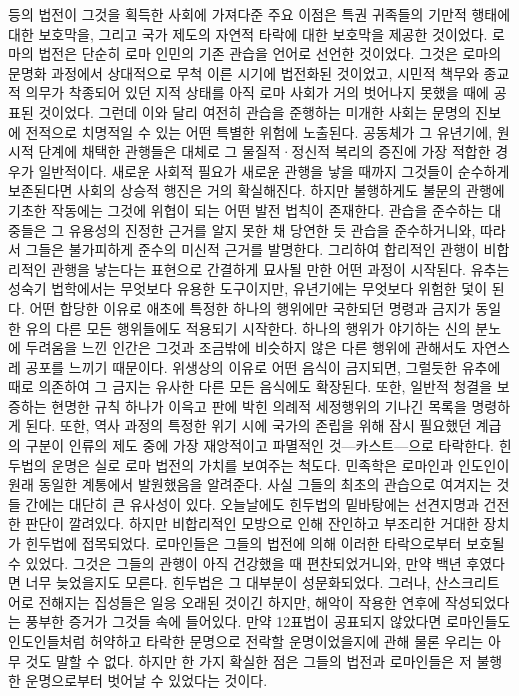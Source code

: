  등의 법전이 그것을 획득한 사회에 가져다준 주요 이점은
특권 귀족들의 기만적 행태에 대한 보호막을,
그리고 국가 제도의 자연적 타락에 대한 보호막을 제공한 것이었다.
로마의 법전은 단순히 로마 인민의 기존 관습을 언어로 선언한 것이었다.
그것은 로마의 문명화 과정에서 상대적으로 무척 이른 시기에 법전화된 것이었고,
시민적 책무와 종교적 의무가 착종되어 있던 지적 상태를 아직
로마 사회가 거의 벗어나지 못했을 때에 공표된 것이었다.
그런데 이와 달리 여전히 관습을 준행하는 미개한 사회는
문명의 진보에 전적으로 치명적일 수 있는 어떤 특별한 위험에 노출된다.
공동체가 그 유년기에, 원시적 단계에 채택한 관행들은
대체로 그 물질적^^b7정신적 복리의 증진에 가장 적합한 경우가 일반적이다.
새로운 사회적 필요가 새로운 관행을 낳을 때까지 그것들이 순수하게 보존된다면
사회의 상승적 행진은 거의 확실해진다.
하지만 불행하게도 불문의 관행에 기초한 작동에는 그것에 위협이 되는
어떤 발전 법칙이 존재한다.
관습을 준수하는 대중들은 그 유용성의 진정한 근거를 알지 못한 채
당연한 듯 관습을 준수하거니와,
따라서 그들은 불가피하게 준수의 미신적 근거를 발명한다.
그리하여 합리적인 관행이 비합리적인 관행을 낳는다는 표현으로
간결하게 묘사될 만한 어떤 과정이 시작된다.
유추는 성숙기 법학에서는 무엇보다 유용한 도구이지만,
유년기에는 무엇보다 위험한 덫이 된다.
어떤 합당한 이유로 애초에 특정한 하나의 행위에만 국한되던 명령과 금지가
동일한 유의 다른 모든 행위들에도 적용되기 시작한다.
하나의 행위가 야기하는 신의 분노에 두려움을 느낀 인간은
그것과 조금밖에 비슷하지 않은 다른 행위에 관해서도
자연스레 공포를 느끼기 때문이다.
위생상의 이유로 어떤 음식이 금지되면,
그럴듯한 유추에 때로 의존하여
그 금지는 유사한 다른 모든 음식에도 확장된다.
또한, 일반적 청결을 보증하는 현명한 규칙 하나가 이윽고
판에 박힌 의례적 세정행위의 기나긴 목록을 명령하게 된다.
또한, 역사 과정의 특정한 위기 시에 국가의 존립을 위해 잠시 필요했던
계급의 구분이 인류의 제도 중에 가장 재앙적이고 파멸적인 것---카스트---으로
타락한다.
힌두법의 운명은 실로 로마 법전의 가치를 보여주는 척도다.
민족학은 로마인과 인도인이 원래 동일한 계통에서 발원했음을 알려준다.
사실 그들의 최초의 관습으로 여겨지는 것들 간에는
대단히 큰 유사성이 있다.
오늘날에도 힌두법의 밑바탕에는 선견지명과 건전한 판단이 깔려있다.
하지만 비합리적인 모방으로 인해 잔인하고 부조리한 거대한 장치가
힌두법에 접목되었다.
로마인들은 그들의 법전에 의해 이러한 타락으로부터 보호될 수 있었다.
그것은 그들의 관행이 아직 건강했을 때 편찬되었거니와,
만약 백년 후였다면 너무 늦었을지도 모른다.
힌두법은 그 대부분이 성문화되었다.
그러나,
산스크리트어로 전해지는 집성들은 일응 오래된 것이긴 하지만,
해악이 작용한 연후에 작성되었다는 풍부한 증거가 그것들 속에 들어있다.
만약 12표법이 공표되지 않았다면 로마인들도 인도인들처럼
허약하고 타락한 문명으로 전락할 운명이었을지에 관해
물론 우리는 아무 것도 말할 수 없다.
하지만 한 가지 확실한 점은 그들의 법전과 
로마인들은 저 불행한 운명으로부터 벗어날 수 있었다는 것이다.


